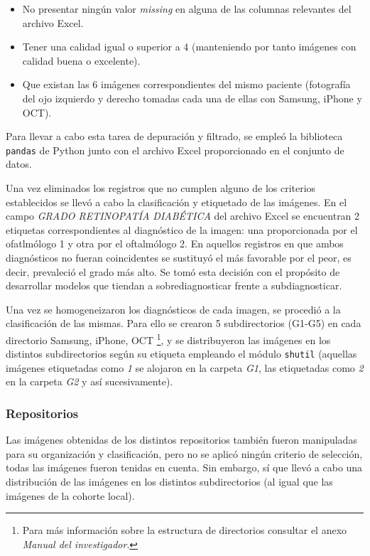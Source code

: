 \begin{itemize}
    \item No presentar ningún valor \textit{missing} en alguna de las columnas relevantes del archivo Excel.
    \item Tener una calidad igual o superior a 4 (manteniendo por tanto imágenes con calidad buena o excelente).
    \item Que existan las 6 imágenes correspondientes del mismo paciente (fotografía del ojo izquierdo y derecho tomadas cada una de ellas con Samsung, iPhone y OCT).
\end{itemize}

Para llevar a cabo esta tarea de depuración y filtrado, se empleó la biblioteca \texttt{pandas} de Python junto con el archivo Excel proporcionado en el conjunto de datos.

Una vez eliminados los registros que no cumplen alguno de los criterios establecidos se llevó a cabo la clasificación y etiquetado de las imágenes. En el campo \textit{GRADO RETINOPATÍA DIABÉTICA} del archivo Excel se encuentran 2 etiquetas correspondientes al diagnóstico de la imagen: una proporcionada por el ofatlmólogo 1 y otra por el oftalmólogo 2. En aquellos registros en que ambos diagnósticos no fueran coincidentes se sustituyó el más favorable por el peor, es decir, prevaleció el grado más alto. Se tomó esta decisión con el propósito de desarrollar modelos que tiendan a sobrediagnosticar frente a subdiagnosticar. 

Una vez se homogeneizaron los diagnósticos de cada imagen, se procedió a la clasificación de las mismas. Para ello se crearon 5 subdirectorios (G1-G5) en cada directorio Samsung, iPhone, OCT \footnote{Para más información sobre la estructura de directorios consultar el anexo \textit{Manual del investigador}.}, y se distribuyeron las imágenes en los distintos subdirectorios según su etiqueta empleando el módulo \texttt{shutil} (aquellas imágenes etiquetadas como \textit{1} se alojaron en la carpeta \textit{G1}, las etiquetadas como \textit{2} en la carpeta \textit{G2} y así sucesivamente).

\subsubsection{Repositorios}

Las imágenes obtenidas de los distintos repositorios también fueron manipuladas para su organización y clasificación, pero no se aplicó ningún criterio de selección, todas las imágenes fueron tenidas en cuenta. Sin embargo, sí que llevó a cabo una distribución de las imágenes en los distintos subdirectorios (al igual que las imágenes de la cohorte local).


